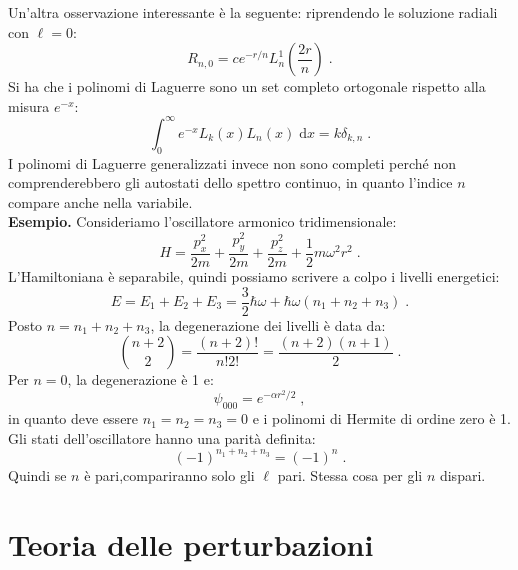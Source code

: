 \documentclass[10pt,a4paper]{report}
\theoremstyle{definition}
\numberwithin{equation}{section}
\newcommand{\diff}[1][]{\mathrm{d}#1}
\begin{document}
Un'altra osservazione interessante è la seguente: riprendendo le soluzione radiali con $\ell=0$:
\begin{equation}
R_{n,0}=ce^{-r/n}L^1_n\left(\frac{2r}{n}\right)\;.
\end{equation}
Si ha che i polinomi di Laguerre sono un set completo ortogonale rispetto alla misura $e^{-x}$:
\begin{equation}
\int_0^{\infty}e^{-x}L_k(x)L_n(x)\;\diff{x}=k\delta_{k,n}\;.
\end{equation}
I polinomi di Laguerre generalizzati invece non sono completi perché non comprenderebbero gli autostati dello spettro continuo, in quanto l'indice $n$ compare anche nella variabile. \\
\textbf{Esempio.} Consideriamo l'oscillatore armonico tridimensionale:
\begin{equation}
H=\frac{p_x^2}{2m}+\frac{p_y^2}{2m}+\frac{p_z^2}{2m}+\frac{1}{2}m\omega^2r^2\;.
\end{equation}
L'Hamiltoniana è separabile, quindi possiamo scrivere a colpo i livelli energetici:
\begin{equation}
E=E_1+E_2+E_3=\frac{3}{2}\hbar\omega +\hbar\omega(n_1+n_2+n_3)\;.
\end{equation}
Posto $n=n_1+n_2+n_3$, la degenerazione dei livelli è data da:
\begin{equation}
\binom{n+2}{2}=\frac{(n+2)!}{n! 2!}=\frac{(n+2)(n+1)}{2}\;.
\end{equation}
Per $n=0$, la degenerazione è 1 e:
\begin{equation}
\psi_{000}=e^{-\alpha r^2/2}\;,
\end{equation}
in quanto deve essere $n_1=n_2=n_3=0$ e i polinomi di Hermite di ordine zero è 1. Gli stati dell'oscillatore hanno una parità definita:
\begin{equation}
(-1)^{n_1+n_2+n_3}=(-1)^n\;.
\end{equation}
Quindi se $n$ è pari,compariranno solo gli $\ell$ pari. Stessa cosa per gli $n$ dispari.
\chapter{Teoria delle perturbazioni}
\end{document}
